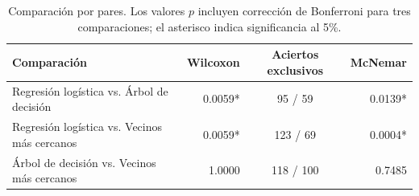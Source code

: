 \begin{table}[H]
\centering
\caption{Comparación por pares. Los valores $p$ incluyen corrección de Bonferroni para tres comparaciones; el asterisco indica significancia al 5\%.}
\label{tab:pruebas}
\small
\begin{tabular}{p{5.2cm} r c r}
\toprule
\textbf{Comparación} & \textbf{Wilcoxon} & \textbf{Aciertos exclusivos} & \textbf{McNemar} \\
\midrule
Regresión logística vs. Árbol de decisión & 0.0059* & 95 / 59 & 0.0139* \\
Regresión logística vs. Vecinos más cercanos & 0.0059* & 123 / 69 & 0.0004* \\
Árbol de decisión vs. Vecinos más cercanos & 1.0000 & 118 / 100 & 0.7485 \\
\bottomrule
\end{tabular}
\end{table}
